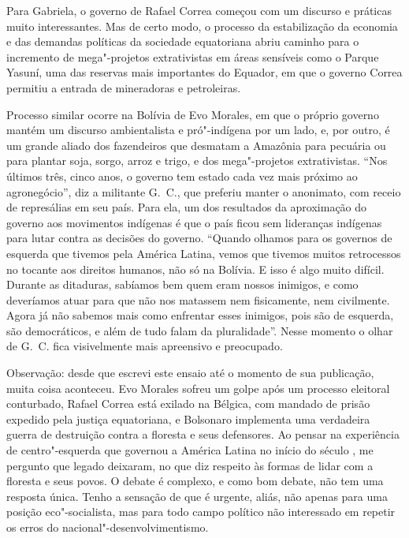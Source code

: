 Para Gabriela, o governo de Rafael Correa começou com um discurso e
práticas muito interessantes. Mas de certo modo, o processo da
estabilização da economia e das demandas políticas da sociedade
equatoriana abriu caminho para o incremento de mega"-projetos
extrativistas em áreas sensíveis como o Parque Yasuní, uma das reservas
mais importantes do Equador, em que o governo Correa permitiu a entrada
de mineradoras e petroleiras.

Processo similar ocorre na Bolívia de Evo Morales, em que o próprio
governo mantém um discurso ambientalista e pró"-indígena por um lado, e,
por outro, é um grande aliado dos fazendeiros que desmatam a Amazônia
para pecuária ou para plantar soja, sorgo, arroz e trigo, e dos mega"-projetos extrativistas. ``Nos últimos três, cinco anos, o governo tem
estado cada vez mais próximo ao agronegócio'', diz a militante G.~C.,
que preferiu manter o anonimato, com receio de represálias em seu país.
Para ela, um dos resultados da aproximação do governo aos movimentos
indígenas é que o país ficou sem lideranças indígenas para lutar contra
as decisões do governo. ``Quando olhamos para os governos de esquerda
que tivemos pela América Latina, vemos que tivemos muitos retrocessos no
tocante aos direitos humanos, não só na Bolívia. E isso é algo muito
difícil. Durante as ditaduras, sabíamos bem quem eram nossos inimigos, e
como deveríamos atuar para que não nos matassem nem fisicamente, nem
civilmente. Agora já não sabemos mais como enfrentar esses inimigos,
pois são de esquerda, são democráticos, e além de tudo falam da
pluralidade''. Nesse momento o olhar de G.~C. fica visivelmente mais
apreensivo e preocupado.

Observação: desde que escrevi este ensaio até o momento de sua publicação, muita coisa aconteceu. Evo Morales sofreu um golpe após um processo eleitoral conturbado, Rafael Correa está exilado na Bélgica, com mandado de prisão expedido pela justiça equatoriana, e Bolsonaro implementa uma verdadeira guerra de destruição contra a floresta e seus defensores. Ao pensar na experiência de centro"-esquerda que governou a América Latina no início do século , me pergunto que legado deixaram, no que diz respeito às formas de lidar com a floresta e seus povos. O debate é complexo, e como bom debate, não tem uma resposta única. Tenho a sensação de que é urgente, aliás, não apenas para uma posição eco"-socialista, mas para todo campo político não interessado em repetir os erros do nacional"-desenvolvimentismo.

\asterisc

